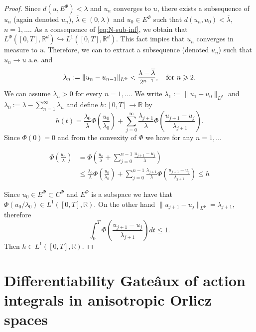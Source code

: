 \documentclass[twoside]{article}
\theoremstyle{remark}
\newcommand{\orlnor}{\|_{L^{\Phi}}}
\newcommand{\lphi}{L^{\Phi}}
\newcommand{\ephi}{E^{\Phi}}
\newcommand{\claseor}{C^{\Phi}}
\newcommand{\rr}{\mathbb{R}}
\renewcommand{\leq}{\leqslant}
\renewcommand{\geq}{\geqslant}
\begin{document}
\begin{proof}
  Since $d({u},\ephi)<\lambda$ and ${u}_n$ converges to ${u}$, there exists   a subsequence of $u_n$ (again denoted $u_n$), $\overline{\lambda}\in (0,\lambda)$ and $u_0\in\ephi$ such that $d(u_n,u_0)<\overline{\lambda}$, $n=1,\ldots$. As a consequence of \eqref{eq:N-sub-inf}, we obtain that $\lphi\left([0,T],\rr^d\right)\hookrightarrow L^1\left([0,T],\rr^d\right)$. This fact impies that $u_n$ converges in measure to $u$. Therefore, we can to extract a subsequence (denoted $u_n$) such that $u_n\to u$ a.e. and
  \[\lambda_{n}:=\|{u}_{n}-{u}_{n-1}\orlnor<\frac{\lambda-\overline{\lambda}}{2^{n-1}},\quad\hbox{for } n\geq 2.\]
 We can assume $\lambda_n>0$ for every $n=1,\ldots$. We write $\lambda_1:=\|u_1-u_0\orlnor$ and  $\lambda_0:=\lambda-\sum_{n=1}^{\infty}\lambda_n$ and define $h:[0,T]\rightarrow\mathbb{R}$  by
 \begin{equation}\label{eq:serie} h(t)=  \frac{\lambda_0}{\lambda}\Phi\left(\frac{u_0}{\lambda_0}\right)+\sum_{j=0}^{\infty}\frac{\lambda_{j+1}}{\lambda}\Phi\left(\frac{u_{j+1}-u_j}{\lambda_{j+1}}\right).
\end{equation}
 Since $\Phi(0)=0$ and from the convexity of $\Phi$ we have for any $n=1,\ldots$


\[
 \begin{split}
   \Phi\left(\frac{u_n}{\lambda}\right) &=\Phi\left(  \frac{u_0}{\lambda}+   \sum_{j=0}^{n-1}\frac{u_{j+1}-u_j}{\lambda} \right)\\
   &\leq
   \frac{\lambda_0}{\lambda}\Phi\left(\frac{u_0}{\lambda_0}\right)+\sum_{j=0}^{n-1}\frac{\lambda_{j+1}}{\lambda}\Phi\left(\frac{u_{j+1}-u_j}{\lambda_{j+1}}\right) \leq h
 \end{split}
\]

Since $u_0\in\ephi\subset \claseor$ and $\ephi$ is a subspace we have that $\Phi(u_0/\lambda_0)\in L^1([0,T],\rr)$.
On the other hand $\|u_{j+1}-u_j\orlnor = \lambda_{j+1}$, therefore
\[
\int_0^T\Phi\left(\frac{u_{j+1}-u_j}{\lambda_{j+1}}\right)dt\leq 1.
\]
Then $h\in L^1([0,T],\rr)$.



\end{proof}





\section{Differentiability Gate\^aux of action integrals in anisotropic Orlicz spaces}
\end{document}
